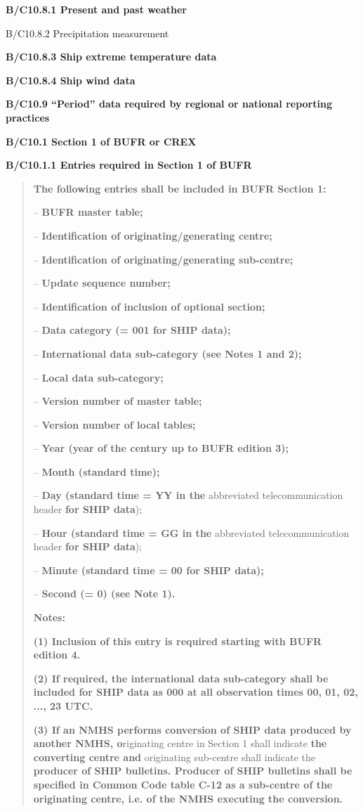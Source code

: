 \textbf{B/C10.8.1 Present and past weather}

B/C10.8.2 Precipitation measurement

\textbf{B/C10.8.3 Ship extreme temperature data}

\textbf{B/C10.8.4 Ship wind data}

\textbf{B/C10.9 ``Period'' data required by regional or national reporting practices}

\textbf{B/C10.1 Section 1 of BUFR or CREX}

\textbf{B/C10.1.1 Entries required in Section 1 of BUFR}

\begin{quote}
\textbf{The following entries shall be included in BUFR Section 1:}

-- \textbf{BUFR master table;}

-- \textbf{Identification of originating/generating centre;}

-- \textbf{Identification of originating/generating sub-centre;}

-- \textbf{Update sequence number;}

-- \textbf{Identification of inclusion of optional section;}

-- \textbf{Data category (= 001 for SHIP data);}

-- \textbf{International data sub-category (see Notes 1 and 2);}

-- \textbf{Local data sub-category;}

-- \textbf{Version number of master table;}

-- \textbf{Version number of local tables;}

-- \textbf{Year (year of the century up to BUFR edition 3);}

-- \textbf{Month (standard time);}

-- \textbf{Day (standard time = YY in the} abbreviated telecommunication header \textbf{for SHIP data});

-- \textbf{Hour (standard time = GG in the} abbreviated telecommunication header \textbf{for SHIP data});

-- \textbf{Minute (standard time = 00 for SHIP data);}

-- \textbf{Second (= 0) (see Note 1).}

\textbf{Notes:}

\textbf{(1) Inclusion of this entry is required starting with BUFR edition 4.}

\textbf{(2) If required, the international data sub-category shall be included for SHIP data as 000 at all observation times 00, 01, 02, ..., 23 UTC.}

\textbf{(3) If an NMHS performs conversion of SHIP data produced by another NMHS, o}riginating centre in Section 1 shall indicate \textbf{the converting centre and} originating sub-centre shall indicate the \textbf{producer of SHIP bulletins. Producer of SHIP bulletins shall be specified in Common Code table C-12 as a sub-centre of the originating centre, i.e. of the NMHS executing the conversion.}
\end{quote}

